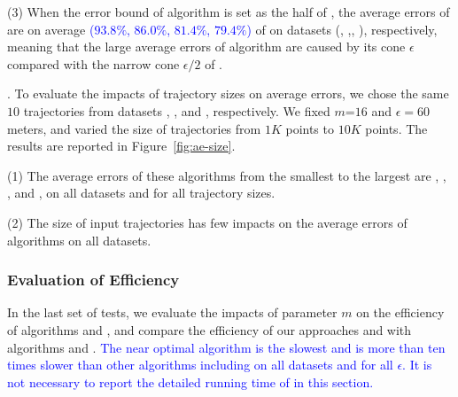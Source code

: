 \ni(3) When the error bound of algorithm \cista is set as the half of \cist, the
average errors of \cista are on average \textcolor{blue}{($93.8\%$, $86.0\%$, $81.4\%$, {$79.4\%$})} of \cist on {datasets} (\sercar, \geolife,\mopsi, \pricar), respectively, meaning that the large average errors of algorithm \cista are caused by its cone \wrt $\epsilon$ compared with the narrow cone \wrt $\epsilon/2$ of \cist.


.
To evaluate the impacts of trajectory sizes on average errors, we chose the same
{$10$} trajectories from  {datasets}  \sercar, \geolife, \mopsi and \pricar, respectively.
We fixed {$m$=$16$} and $\epsilon = 60$ meters, and varied the size  of trajectories from $1K$ points to $10K$ points.
%
The results are reported in Figure~\ref{fig:ae-size}.

\ni(1) The average errors of these algorithms from the smallest to the largest are \squishe, \dps, \cist, \cisto and \cista, on all datasets and for all trajectory sizes. %

\ni(2) The size of input trajectories has few impacts on the average errors of \lsa algorithms on all datasets.





\subsubsection{Evaluation of Efficiency}

In the last set of tests, we evaluate the impacts of parameter $m$ on the efficiency of algorithms \cist and \cista, and compare the efficiency of our approaches \cist and \cista with algorithms \dps and \squishe.
\textcolor{blue}{The near optimal algorithm \cisto is the slowest and is more than ten times slower than other algorithms including \dpa on all datasets and for all $\epsilon$. It is not necessary to report the detailed running time of \cisto in this section.}
%




